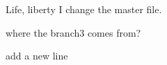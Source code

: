 \documentclass{article}
\begin{document}
Life, liberty
I change the master file.

where the branch3 comes from?

add a new line
\end{document}
